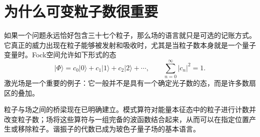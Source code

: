\section{为什么可变粒子数很重要}

如果一个问题永远恰好包含三十七个粒子，那么场的语言就只是可选的记账方式。它真正的威力出现在粒子能够被发射和吸收时，尤其是当粒子数本身就是一个量子变量时。Fock空间允许如下形式的态
\begin{equation}
|\Phi\rangle
=c_0|0\rangle+c_1|1\rangle+c_2|2\rangle+\cdots,
\qquad
\sum_{n=0}^{\infty}|c_n|^2=1.
\end{equation}
激光场是一个重要的例子：它一般并不是具有一个确定光子数的态，而是许多数扇区的叠加。

粒子与场之间的桥梁现在已明确建立。模式算符对能量本征态中的粒子进行计数并改变粒子数；场将这些算符与一组完备的波函数结合起来，从而可以在指定位置产生或移除粒子。谐振子的代数已成为玻色子量子场的基本语言。

